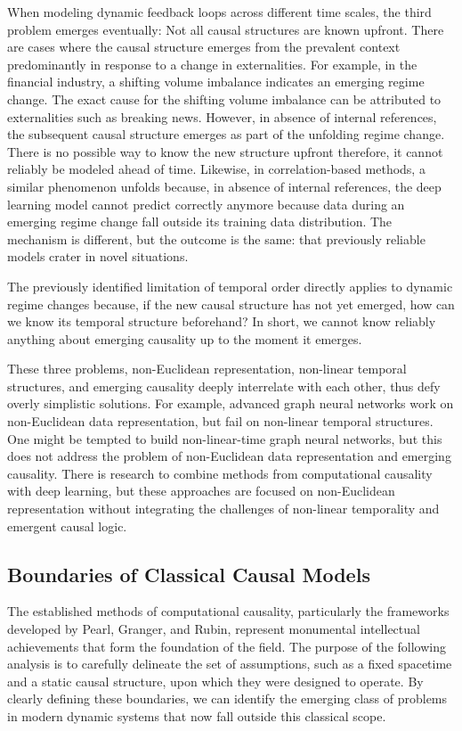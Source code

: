 When modeling dynamic feedback loops across different time scales, the third problem emerges eventually: Not all causal structures are known upfront. There are cases where the causal structure emerges from the prevalent context predominantly in response to a change in externalities. For example, in the financial industry, a shifting volume imbalance indicates an emerging regime change. The exact cause for the shifting volume imbalance can be attributed to externalities such as breaking news. However, in absence of internal references, the subsequent  causal structure emerges as part of the unfolding regime change. There is no possible way to know the new structure upfront therefore, it cannot reliably be modeled ahead of time. Likewise, in correlation-based methods, a similar phenomenon unfolds because, in absence of internal references, the deep learning model cannot predict correctly anymore because data during an emerging regime change fall outside its training data distribution. The mechanism is different, but the outcome is the same: that previously reliable models crater in novel situations.

The previously identified limitation of temporal order directly applies to dynamic regime changes because, if the new causal structure has not yet emerged, how can we know its temporal structure beforehand? In short, we cannot know reliably anything about emerging causality up to the moment it emerges.

These three problems, non-Euclidean representation, non-linear temporal structures, and emerging causality deeply interrelate with each other, thus defy overly simplistic solutions. For example, advanced graph neural networks work on non-Euclidean data representation, but fail on non-linear temporal structures. One might be tempted to build non-linear-time graph neural networks, but this does not address the problem of non-Euclidean data representation and emerging causality. There is research to combine methods from computational causality with deep learning, but these approaches are focused on non-Euclidean representation without integrating the challenges of non-linear temporality and emergent causal logic.

\subsection{Boundaries of Classical Causal Models}

The established methods of computational causality, particularly the frameworks developed by Pearl, Granger, and Rubin, represent monumental intellectual achievements that form the foundation of the field. The purpose of the following analysis is to carefully delineate the set of assumptions, such as a fixed spacetime and a static causal structure, upon which they were designed to operate. By clearly defining these boundaries, we can identify the emerging class of problems in modern dynamic systems that now fall outside this classical scope. 

